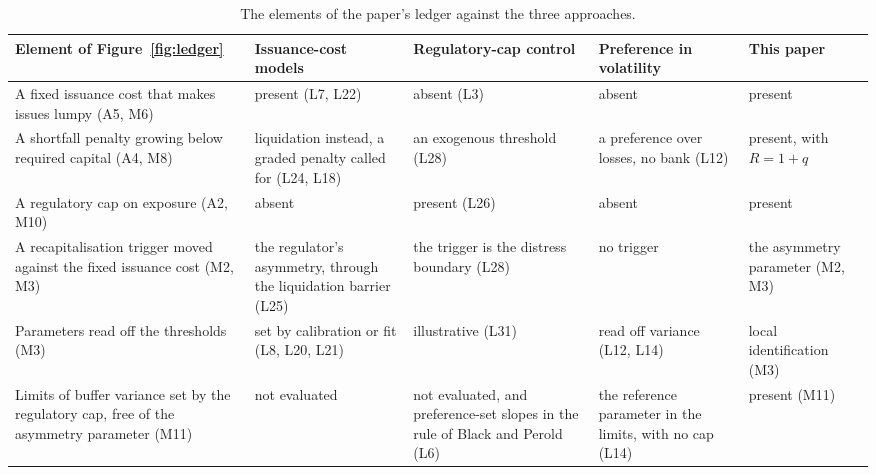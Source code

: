 \begin{table}[t]
\footnotesize
\caption{The elements of the paper's ledger against the three approaches.}\label{tab:approaches}
\begin{tabular}{@{}P{3.4cm}P{3.1cm}P{3.1cm}P{3.1cm}P{2.8cm}@{}}
\toprule
Element of Figure~\ref{fig:ledger} & Issuance-cost models & Regulatory-cap control & Preference in volatility & This paper \\
\midrule
A fixed issuance cost that makes issues lumpy (A5, M6) & present (L7, L22) & absent (L3) & absent & present \\ \addlinespace
A shortfall penalty growing below required capital (A4, M8) & liquidation instead, a graded penalty called for (L24, L18) & an exogenous threshold (L28) & a preference over losses, no bank (L12) & present, with $R=1+q$ \\ \addlinespace
A regulatory cap on exposure (A2, M10) & absent & present (L26) & absent & present \\ \addlinespace
A recapitalisation trigger moved against the fixed issuance cost (M2, M3) & the regulator's asymmetry, through the liquidation barrier (L25) & the trigger is the distress boundary (L28) & no trigger & the asymmetry parameter (M2, M3) \\ \addlinespace
Parameters read off the thresholds (M3) & set by calibration or fit (L8, L20, L21) & illustrative (L31) & read off variance (L12, L14) & local identification (M3) \\ \addlinespace
Limits of buffer variance set by the regulatory cap, free of the asymmetry parameter (M11) & not evaluated & not evaluated, and preference-set slopes in the rule of Black and Perold (L6) & the reference parameter in the limits, with no cap (L14) & present (M11) \\
\bottomrule
\end{tabular}
\end{table}

